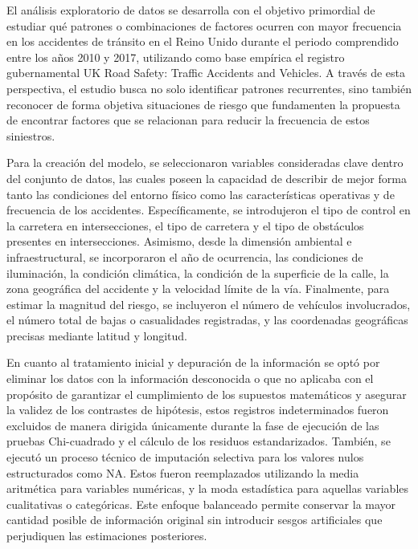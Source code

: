 \documentclass[12pt]{article}
\begin{document}
El análisis exploratorio de datos se desarrolla con el objetivo primordial de estudiar qué patrones o combinaciones de factores ocurren con mayor frecuencia en los accidentes de tránsito en el Reino Unido durante el periodo comprendido entre los años 2010 y 2017, utilizando como base empírica el registro gubernamental UK Road Safety: Traffic Accidents and Vehicles. A través de esta perspectiva, el estudio busca no solo identificar patrones recurrentes, sino también reconocer de forma objetiva situaciones de riesgo que fundamenten la propuesta de encontrar factores que se relacionan para reducir la frecuencia de estos siniestros.

Para la creación del modelo, se seleccionaron variables consideradas clave dentro del conjunto de datos, las cuales poseen la capacidad de describir de mejor forma tanto las condiciones del entorno físico como las características operativas y de frecuencia de los accidentes. Específicamente, se introdujeron el tipo de control en la carretera en intersecciones, el tipo de carretera y el tipo de obstáculos presentes en intersecciones. Asimismo, desde la dimensión ambiental e infraestructural, se incorporaron el año de ocurrencia, las condiciones de iluminación, la condición climática, la condición de la superficie de la calle, la zona geográfica del accidente y la velocidad límite de la vía. Finalmente, para estimar la magnitud del riesgo, se incluyeron el número de vehículos involucrados, el número total de bajas o casualidades registradas, y las coordenadas geográficas precisas mediante latitud y longitud.

En cuanto al tratamiento inicial y depuración de la información se optó por eliminar los datos con la información desconocida o que no aplicaba con el propósito de garantizar el cumplimiento de los supuestos matemáticos y asegurar la validez de los contrastes de hipótesis, estos registros indeterminados fueron excluidos de manera dirigida únicamente durante la fase de ejecución de las pruebas Chi-cuadrado y el cálculo de los residuos estandarizados.  También, se ejecutó un proceso técnico de imputación selectiva para los valores nulos estructurados como NA. Estos fueron reemplazados utilizando la media aritmética para variables numéricas, y la moda estadística para aquellas variables cualitativas o categóricas. Este enfoque balanceado permite conservar la mayor cantidad posible de información original sin introducir sesgos artificiales que perjudiquen las estimaciones posteriores.
\end{document}
